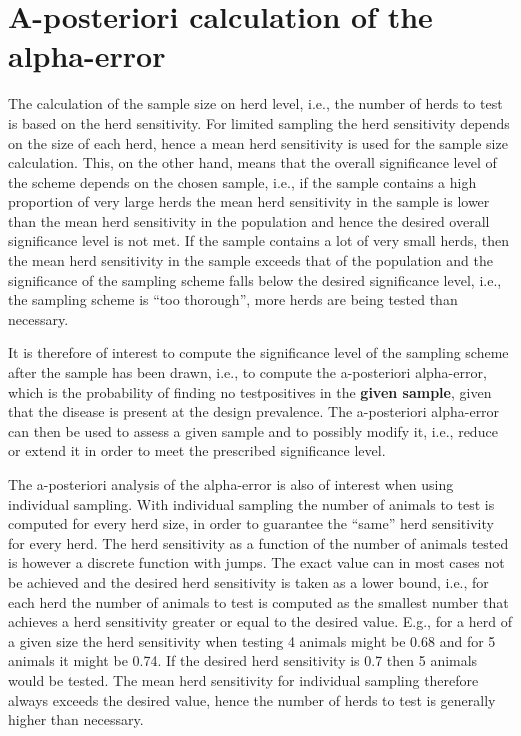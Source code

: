 \documentclass[nojss]{jss}
\begin{document}
\section{A-posteriori calculation of the alpha-error}
\label{sec:aposteriori}

The calculation of the sample size on herd level, i.e., the number 
of herds to test is based on the herd sensitivity. For limited 
sampling the herd sensitivity depends on the size of each herd, 
hence a mean herd sensitivity is used for the sample size 
calculation. This, on the other hand, means that the overall 
significance level of the scheme depends on the chosen sample, i.e., 
if the sample contains a high proportion of very large herds the 
mean herd sensitivity in the sample is lower than the mean herd 
sensitivity in the population and hence the desired overall 
significance level is not met. If the sample contains a lot of very 
small herds, then the mean herd sensitivity in the sample exceeds 
that of the population and the significance of the sampling scheme 
falls below the desired significance level, i.e., the sampling 
scheme is ``too thorough'', more herds are being tested than 
necessary. 

It is therefore of interest to compute the significance level of the 
sampling scheme after the sample has been drawn, i.e., to compute 
the a-posteriori alpha-error, which is the probability of finding no 
testpositives in the \textbf{given sample}, given that the disease 
is present at the design prevalence. The a-posteriori alpha-error 
can then be used to assess a given sample and to possibly modify it, 
i.e., reduce or extend it in order to meet the prescribed 
significance level. 

The a-posteriori analysis of the alpha-error is also of interest 
when using individual sampling. With individual sampling the number 
of animals to test is computed for every herd size, in order to 
guarantee the ``same'' herd sensitivity for every herd. The herd 
sensitivity as a function of the number of animals tested is however 
a discrete function with jumps. The exact value can in most cases 
not be achieved and the desired herd sensitivity is taken as a lower 
bound, i.e., for each herd the number of animals to test is computed 
as the smallest number that achieves a herd sensitivity greater or 
equal to the desired value. E.g., for a herd of a given size the 
herd sensitivity when testing 4 animals might be 0.68 and for 5 
animals it might be 0.74. If the desired herd sensitivity is 0.7 
then 5 animals would be tested. The mean herd sensitivity for 
individual sampling therefore always exceeds the desired value, 
hence the number of herds to test is generally higher than 
necessary. 
\end{document}
